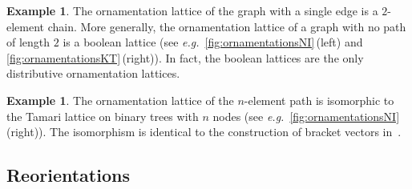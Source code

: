 \documentclass{amsart}
\theoremstyle{definition}
\newtheorem{example}[theorem]{Example}
\newcommand{\eg}{\textit{e.g.}~} %
\begin{document}
\begin{example}
The ornamentation lattice of the graph with a single edge is a $2$-element chain.
More generally, the ornamentation lattice of a graph with no path of length $2$ is a boolean lattice (see \eg \cref{fig:ornamentationsNI}\,(left) and \ref{fig:ornamentationsKT}\,(right)).
In fact, the boolean lattices are the only distributive ornamentation lattices.
\end{example}

\begin{example}
The ornamentation lattice of the $n$-element path is isomorphic to the Tamari lattice on binary trees with $n$ nodes (see \eg \cref{fig:ornamentationsNI}\,(right)).
The isomorphism is identical to the construction of bracket vectors in~\cite{HuangTamari}.
\end{example}


\subsection{Reorientations}
\label{subsec:reorientations}
\end{document}
